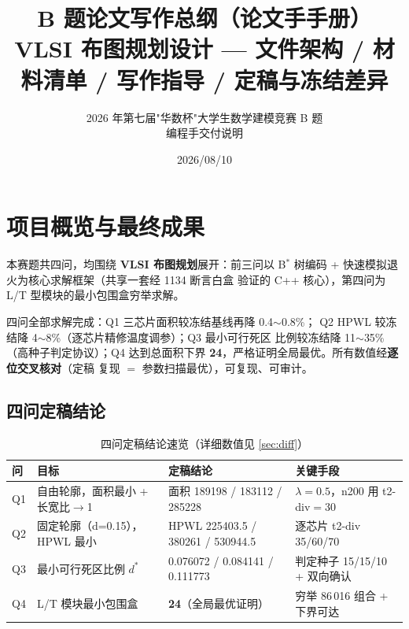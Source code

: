 \documentclass[12pt,a4paper]{article}
\title{\textbf{B 题论文写作总纲（论文手手册）}\\[6pt]
\large VLSI 布图规划设计 --- 文件架构 / 材料清单 / 写作指导 / 定稿与冻结差异}
\author{2026 年第七届"华数杯"大学生数学建模竞赛 B 题 \\ 编程手交付说明}
\date{2026/08/10}
\begin{document}
\maketitle
\tableofcontents
\newpage

\section{项目概览与最终成果}

本赛题共四问，均围绕 \textbf{VLSI 布图规划}展开：前三问以
B$^*$ 树编码 + 快速模拟退火为核心求解框架（共享一套经 1134 断言白盒
验证的 C++ 核心），第四问为 L/T 型模块的最小包围盒穷举求解。

\begin{tcolorbox}[colback=green!5, colframe=green!50!black, title=一句话结论]
四问全部求解完成：Q1 三芯片面积较冻结基线再降 0.4$\sim$0.8\%；
Q2 HPWL 较冻结降 4$\sim$8\%（逐芯片精修温度调参）；Q3 最小可行死区
比例较冻结降 11$\sim$35\%（高种子判定协议）；Q4 达到总面积下界
\textbf{24}，严格证明全局最优。所有数值经\textbf{逐位交叉核对}（定稿
复现 $=$ 参数扫描最优），可复现、可审计。
\end{tcolorbox}

\subsection{四问定稿结论}

\begin{table}[H]
\centering
\caption{四问定稿结论速览（详细数值见 \ref{sec:diff}）}
\scriptsize
\setlength{\tabcolsep}{2.5pt}
\begin{tabular}{llll}
\toprule
问 & 目标 & 定稿结论 & 关键手段 \\
\midrule
Q1 & 自由轮廓，面积最小 + 长宽比$\to$1 & 面积 189198 / 183112 / 285228 & $\lambda{=}0.5$，n200 用 t2-div$=$30 \\
Q2 & 固定轮廓（d=0.15），HPWL 最小 & HPWL 225403.5 / 380261 / 530944.5 & 逐芯片 t2-div 35/60/70 \\
Q3 & 最小可行死区比例 $d^*$ & 0.076072 / 0.084141 / 0.111773 & 判定种子 15/15/10 + 双向确认 \\
Q4 & L/T 模块最小包围盒 & \textbf{24}（全局最优证明） & 穷举 86\,016 组合 + 下界可达 \\
\bottomrule
\end{tabular}
\end{table}
\end{document}
